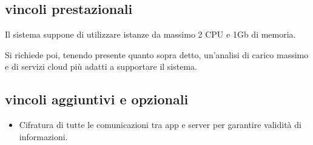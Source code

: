 \subsection{vincoli prestazionali}

Il sistema suppone di utilizzare istanze da massimo 2 CPU e 1Gb di memoria.

Si richiede poi, tenendo presente quanto sopra detto, un'analisi di carico massimo e di servizi cloud più adatti a supportare il sistema.

\subsection{vincoli aggiuntivi e opzionali}
\begin{itemize}
    \item Cifratura di tutte le comunicazioni tra app e server per garantire validità di informazioni.
\end{itemize}

